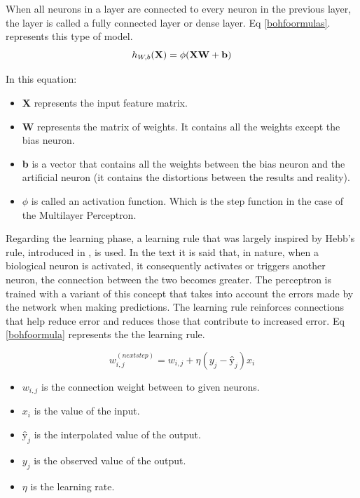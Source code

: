 When all neurons in a layer are connected to every neuron in the previous layer, the layer is called a fully connected layer or dense layer.
Eq \eqref{bohfoormulas}. represents this type of model.
\begin{equation} 
   h_ {W,b} ({\bf X}) = \phi({\bf XW + b})
    \label{bohfoormulas}
\end{equation} 

In this equation:
\begin{itemize}
    \item \textbf{X} represents the input feature matrix.
    \item \textbf{W} represents the matrix of weights. It contains all the weights except the bias neuron.

    \item \textbf{b} is a vector that contains all the weights between the bias neuron and the artificial neuron (it contains the distortions between the results and reality).
    \item \textbf{$\phi$} is called an activation function. Which is the step function in the case of the Multilayer Perceptron.
\end{itemize}

Regarding the learning phase, a learning rule that was largely inspired by Hebb's rule, introduced in \citeauthor{Morris1999} \autocite{Morris1999}, is used. In the text it is said that, in nature, when a biological neuron is activated, it consequently activates or triggers another neuron, the connection between the two becomes greater. The perceptron is trained with a variant of this concept that takes into account the errors made by the network when making predictions. The learning rule reinforces connections that help reduce error and reduces those that contribute to increased error. Eq \eqref{bohfoormula} represents the the learning rule.

\begin{equation} 
   w_ {i, j} ^{(next step)} = w _{i, j }+ \eta( y _{j} - ŷ_{j}) x_{i} 
    \label{bohfoormula}
\end{equation}

\begin{itemize}
    \item $w _{i, j}$ is the connection weight between to given neurons.
    \item $x_{i} $ is the value of the input.
    \item $ŷ _{j}$ is the interpolated value of the output.
    \item $y_{j}$ is the observed value of the output.
    \item $\eta$ is the learning rate.
\end{itemize}
